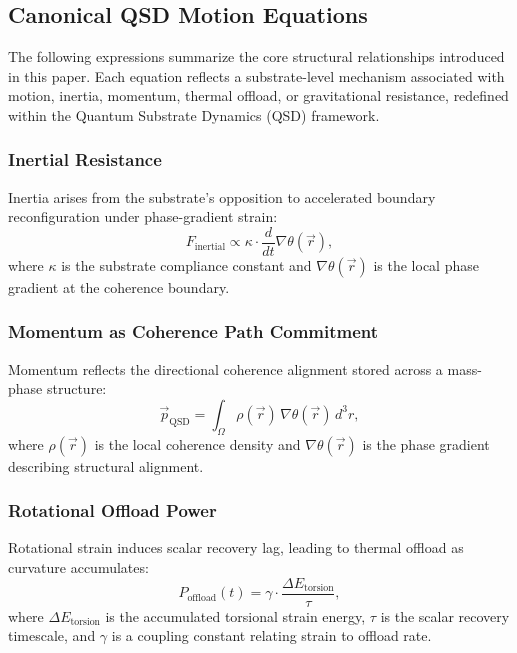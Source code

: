 \documentclass[entropy,article,submit,pdftex,moreauthors]{Definitions/mdpi}
\begin{document}
\appendixstart
\appendix
\section[\appendixname~\thesection]{}
\subsection[\appendixname~\thesubsection]{Canonical QSD Motion Equations}
The following expressions summarize the core structural relationships introduced in this paper. Each equation reflects a substrate-level mechanism associated with motion, inertia, momentum, thermal offload, or gravitational resistance, redefined within the Quantum Substrate Dynamics (QSD) framework.

\subsubsection{Inertial Resistance}
Inertia arises from the substrate’s opposition to accelerated boundary reconfiguration under phase-gradient strain:
\begin{equation}
    F_{\text{inertial}} \propto \kappa \cdot \frac{d}{dt} \nabla \theta(\vec{r}),
\end{equation}
where \( \kappa \) is the substrate compliance constant and \( \nabla \theta(\vec{r}) \) is the local phase gradient at the coherence boundary.

\subsubsection{Momentum as Coherence Path Commitment}
Momentum reflects the directional coherence alignment stored across a mass-phase structure:
\begin{equation}
    \vec{p}_{\text{QSD}} = \int_{\Omega} \rho(\vec{r}) \, \nabla \theta(\vec{r}) \, d^3r,
\end{equation}
where \( \rho(\vec{r}) \) is the local coherence density and \( \nabla \theta(\vec{r}) \) is the phase gradient describing structural alignment.

\subsubsection{Rotational Offload Power}
Rotational strain induces scalar recovery lag, leading to thermal offload as curvature accumulates:
\begin{equation}
    P_{\text{offload}}(t) = \gamma \cdot \frac{\Delta E_{\text{torsion}}}{\tau},
\end{equation}
where \( \Delta E_{\text{torsion}} \) is the accumulated torsional strain energy, \( \tau \) is the scalar recovery timescale, and \( \gamma \) is a coupling constant relating strain to offload rate.
\end{document}
